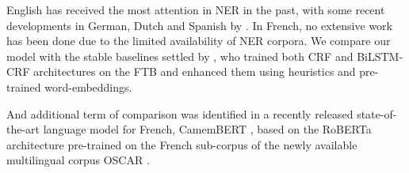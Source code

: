 


English has received the most attention in NER in the past, with some recent developments in German, Dutch and Spanish by \citet{strakova-etal-2019-neural}. In French, no extensive work has been done due to the limited availability of NER corpora. We compare our model with the stable baselines settled by \citep{dupont-2017-exploration}, who trained both CRF and BiLSTM-CRF architectures on the FTB and enhanced them using heuristics and pre-trained word-embeddings.

And additional term of comparison was identified in a recently released state-of-the-art language model for French, CamemBERT \citep{martin-etal-2020-camembert}, based on the RoBERTa architecture pre-trained on the French sub-corpus of the newly available multilingual corpus OSCAR \citep{ortiz-suarez-etal-2019-asynchronous}.



